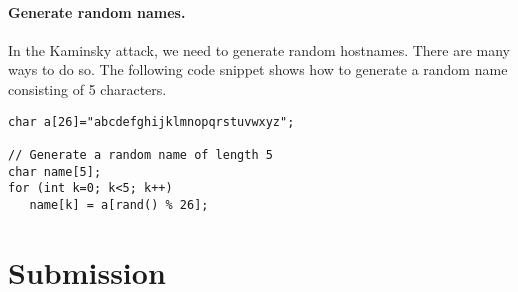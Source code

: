 \paragraph{Generate random names.} In the Kaminsky attack, we need to 
generate random hostnames. There are many ways to do so. The following 
code snippet shows how to generate a random name consisting of 
5 characters. 

\begin{lstlisting}
char a[26]="abcdefghijklmnopqrstuvwxyz";

// Generate a random name of length 5
char name[5];
for (int k=0; k<5; k++)  
   name[k] = a[rand() % 26];
\end{lstlisting}
 



\section{Submission}

\seedsubmission


\thispagestyle{empty}

\def\baselinestretch{1}









